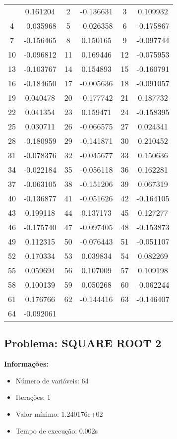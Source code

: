 \documentclass[12pt]{article}
\begin{document}
\begin{longtable}{@{}cc|cc|cc@{}}
\bottomrule
\endlastfoot
1 & 0.161204 & 2 & -0.136631 & 3 & 0.109932 \\
4 & -0.035968 & 5 & -0.026358 & 6 & -0.175867 \\
7 & -0.156465 & 8 & 0.150165 & 9 & -0.097744 \\
10 & -0.096812 & 11 & 0.169446 & 12 & -0.075953 \\
13 & -0.103767 & 14 & 0.154893 & 15 & -0.160791 \\
16 & -0.184650 & 17 & -0.005636 & 18 & -0.091057 \\
19 & 0.040478 & 20 & -0.177742 & 21 & 0.187732 \\
22 & 0.041354 & 23 & 0.159471 & 24 & -0.158395 \\
25 & 0.030711 & 26 & -0.066575 & 27 & 0.024341 \\
28 & -0.180959 & 29 & -0.141871 & 30 & 0.210452 \\
31 & -0.078376 & 32 & -0.045677 & 33 & 0.150636 \\
34 & -0.022184 & 35 & -0.056118 & 36 & 0.162281 \\
37 & -0.063105 & 38 & -0.151206 & 39 & 0.067319 \\
40 & -0.136877 & 41 & -0.051626 & 42 & -0.164105 \\
43 & 0.199118 & 44 & 0.137173 & 45 & 0.127277 \\
46 & -0.175740 & 47 & -0.097405 & 48 & -0.153873 \\
49 & 0.112315 & 50 & -0.076443 & 51 & -0.051107 \\
52 & 0.170334 & 53 & 0.039834 & 54 & 0.082269 \\
55 & 0.059694 & 56 & 0.107009 & 57 & 0.109198 \\
58 & 0.100139 & 59 & 0.050268 & 60 & -0.062244 \\
61 & 0.176766 & 62 & -0.144416 & 63 & -0.146407 \\
64 & -0.092061 &  &  &  &  \\

\end{longtable}


\newpage            
\subsection{Problema: SQUARE ROOT 2}

\textbf{Informações:}
\begin{itemize}
\item Número de variáveis: 64
\item Iterações: 1
\item Valor mínimo: 1.240176e+02
\item Tempo de execução: 0.002s
\end{itemize}
\end{document}
